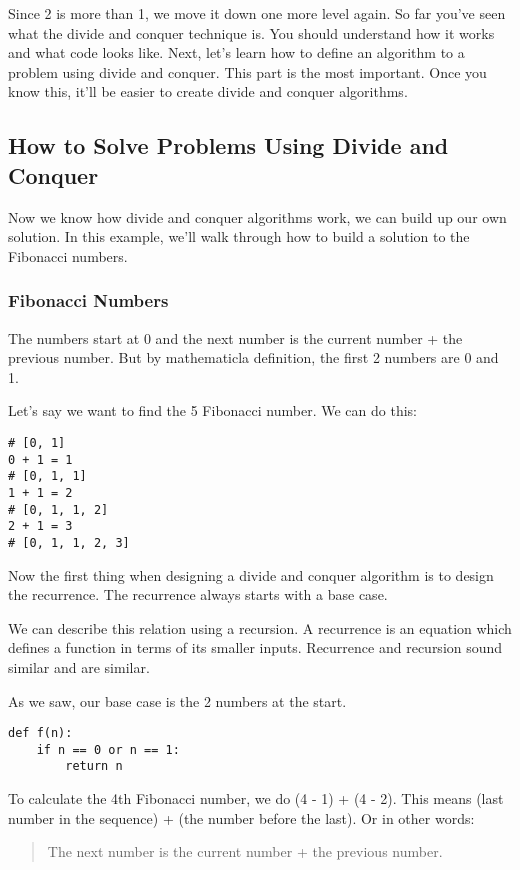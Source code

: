\documentclass{article}
\begin{document}
Since 2 is more than 1, we move it down one more level again. So far you've seen what the divide and conquer technique is. You should understand how it works and what code looks like. Next, let's learn how to define an algorithm to a problem using divide and conquer. This part is the most important. Once you know this, it'll be easier to create divide and conquer algorithms.

\subsection{How to Solve Problems Using Divide and Conquer}
Now we know how divide and conquer algorithms work, we can build up our own solution. In this example, we'll walk through how to build a solution to the Fibonacci numbers.
\subsubsection{Fibonacci Numbers}

The numbers start at 0 and the next number is the current number + the previous number. But by mathematicla definition, the first 2 numbers are 0 and 1.

Let's say we want to find the 5 Fibonacci number. We can do this:
\begin{verbatim}
# [0, 1]
0 + 1 = 1 
# [0, 1, 1]
1 + 1 = 2 
# [0, 1, 1, 2]
2 + 1 = 3
# [0, 1, 1, 2, 3]

\end{verbatim}
Now the first thing when designing a divide and conquer algorithm is to design the recurrence. The recurrence always starts with a base case.

We can describe this relation using a recursion. A recurrence is an equation which defines a function in terms of its smaller inputs. Recurrence and recursion sound similar and are similar.

As we saw, our base case is the 2 numbers at the start.
\begin{verbatim}
def f(n):
	if n == 0 or n == 1:
    	return n
\end{verbatim}

To calculate the 4th Fibonacci number, we do (4 - 1) + (4 - 2). This means (last number in the sequence) + (the number before the last).  Or in other words:
\begin{quote}
    The next number is the current number + the previous number.
\end{quote}
\end{document}
